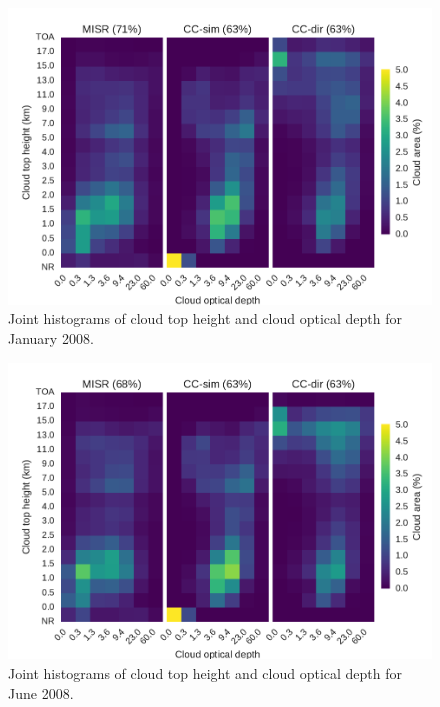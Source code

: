 \begin{figure}
\centering
\includegraphics[width=\columnwidth]{graphics/misr_clmisr_Pacific_2008-01.pdf}
\caption{Joint histograms of cloud top height and cloud optical depth for January 2008.}
\label{misr_cthtau_Pacific_january}
\end{figure}

\begin{figure}
\centering
\includegraphics[width=\columnwidth]{graphics/misr_clmisr_Pacific_2008-06.pdf}
\caption{Joint histograms of cloud top height and cloud optical depth for June 2008.}
\label{misr_cthtau_Pacific_june}
\end{figure}

